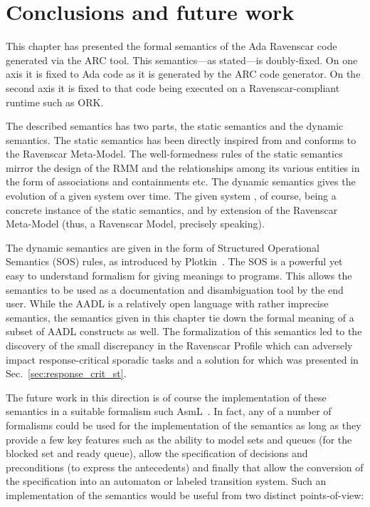 
\section{Conclusions and future work}
This chapter has presented the formal semantics of the Ada Ravenscar
code generated via the ARC tool. This semantics---as stated---is
doubly-fixed. On one axis it is fixed to Ada code as it is generated
by the ARC code generator. On the second axis it is fixed to that code
being executed on a Ravenscar-compliant runtime such as ORK.

The described semantics has two parts, the static semantics and the
dynamic semantics. The static semantics has been directly inspired
from and conforms to the Ravenscar Meta-Model. The well-formedness
rules of the static semantics mirror the design of the RMM and the
relationships among its various entities in the form of associations
and containments etc. The dynamic semantics gives the evolution of a
given system over time. The given system , of course, being a concrete
instance of the static semantics, and by extension of the Ravenscar
Meta-Model (thus, a Ravenscar Model, precisely speaking).

The dynamic semantics are given in the form of Structured Operational
Semantics (SOS) rules, as introduced by
Plotkin~\cite{plotkin-sos}. The SOS is a powerful yet easy to
understand formalism for giving meanings to programs. This allows the
semantics to be used as a documentation and disambiguation tool by the
end user. While the AADL is a relatively open language with rather
imprecise semantics, the semantics given in this chapter tie down the
formal meaning of a subset of AADL constructs as well. The
formalization of this semantics led to the discovery of the small
discrepancy in the Ravenscar Profile which can adversely impact
response-critical sporadic tasks and a solution for which was
presented in Sec.~\ref{sec:response_crit_st}.

The future work in this direction is of course the implementation of
these semantics in a suitable formalism such
AsmL~\cite{gurevich@tcs05}. In fact, any of a number of formalisms
could be used for the implementation of the semantics as long as they
provide a few key features such as the ability to model sets and
queues (for the blocked set and ready queue), allow the specification
of decisions and preconditions (to express the antecedents) and
finally that allow the conversion of the specification into an
automaton or labeled transition system. Such an implementation of the
semantics would be useful from two distinct points-of-view:

